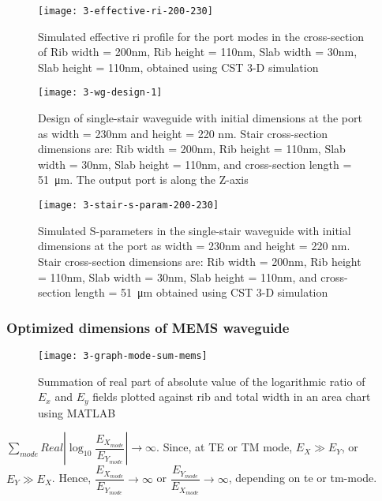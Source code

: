 \documentclass[../report.tex]{subfiles}
\begin{document}
\begin{figure}[H] %
	\centering
	\texttt{[image: 3-effective-ri-200-230]}
	\caption{Simulated effective \gls{ri} profile for the port modes in the cross-section of Rib width = 200nm, Rib height = 110nm, Slab width = 30nm, Slab height = 110nm, obtained using CST 3-D simulation}
	\label{fig:3_effective_ri_200_230}
\end{figure}


\begin{figure}[H] %
	\centering
	\texttt{[image: 3-wg-design-1]}
	\caption{Design of single-stair waveguide with initial dimensions at the port as width = 230nm and height = 220 nm. Stair cross-section dimensions are: Rib width = 200nm, Rib height = 110nm, Slab width = 30nm, Slab height = 110nm, and cross-section length = \SI{51}{\micro\meter}. The output port is along the Z-axis}
	\label{fig:3_wg_design_1}
\end{figure}

\begin{figure}[H] %
	\centering
	\texttt{[image: 3-stair-s-param-200-230]}
	\caption{Simulated S-parameters in the single-stair waveguide with initial dimensions at the port as width = 230nm and height = 220 nm. Stair cross-section dimensions are: Rib width = 200nm, Rib height = 110nm, Slab width = 30nm, Slab height = 110nm, and cross-section length = \SI{51}{\micro\meter} obtained using CST 3-D simulation}
	\label{fig:3_stair_s_param_200_230}
\end{figure}

\subsubsection{Optimized dimensions of MEMS waveguide}
\begin{figure}[H] %
	\centering
	\texttt{[image: 3-graph-mode-sum-mems]}
	\caption{Summation of real part of absolute value of the logarithmic ratio of $E_x$ and $E_y$ fields plotted against rib and total width in an area chart using MATLAB}
	\label{fig:3_graph_mode_sum_mems}
\end{figure}

$\sum _{mode}Real\left| \log _{10}\dfrac {E_{X_{mode}}} {E_{Y_{mode}}}\right| \rightarrow \infty$. Since, at TE or TM mode, $E_X \gg E_Y$, or $E_Y \gg E_X$. Hence, $\dfrac {E_{X_{mode}}} {E_{Y_{mode}}} \rightarrow \infty$ or $\dfrac {E_{Y_{mode}}} {E_{X_{mode}}} \rightarrow \infty$, depending on \gls{te} or \gls{tm}-mode.
\end{document}
